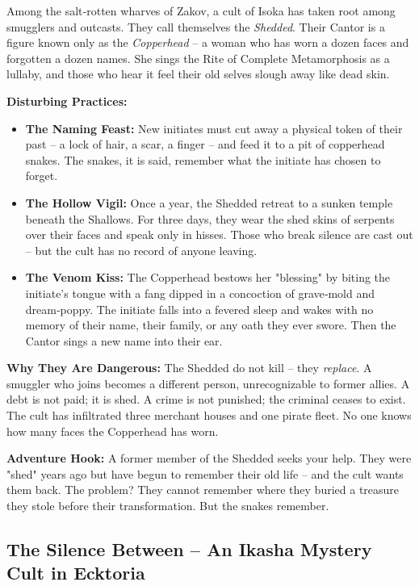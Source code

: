 \documentclass[10pt,a5paper]{book}
\begin{document}
Among the salt‑rotten wharves of Zakov, a cult of Isoka has taken root among smugglers and outcasts. They call themselves the \textit{Shedded}. Their Cantor is a figure known only as the \textit{Copperhead} -- a woman who has worn a dozen faces and forgotten a dozen names. She sings the Rite of Complete Metamorphosis as a lullaby, and those who hear it feel their old selves slough away like dead skin.

\textbf{Disturbing Practices:}
\begin{itemize}
    \item \textbf{The Naming Feast:} New initiates must cut away a physical token of their past -- a lock of hair, a scar, a finger -- and feed it to a pit of copperhead snakes. The snakes, it is said, remember what the initiate has chosen to forget.
    \item \textbf{The Hollow Vigil:} Once a year, the Shedded retreat to a sunken temple beneath the Shallows. For three days, they wear the shed skins of serpents over their faces and speak only in hisses. Those who break silence are cast out -- but the cult has no record of anyone leaving.
    \item \textbf{The Venom Kiss:} The Copperhead bestows her "blessing" by biting the initiate's tongue with a fang dipped in a concoction of grave‑mold and dream‑poppy. The initiate falls into a fevered sleep and wakes with no memory of their name, their family, or any oath they ever swore. Then the Cantor sings a new name into their ear.
\end{itemize}

\textbf{Why They Are Dangerous:} The Shedded do not kill -- they \textit{replace}. A smuggler who joins becomes a different person, unrecognizable to former allies. A debt is not paid; it is shed. A crime is not punished; the criminal ceases to exist. The cult has infiltrated three merchant houses and one pirate fleet. No one knows how many faces the Copperhead has worn.

\textbf{Adventure Hook:} A former member of the Shedded seeks your help. They were "shed" years ago but have begun to remember their old life -- and the cult wants them back. The problem? They cannot remember where they buried a treasure they stole before their transformation. But the snakes remember.

\subsection{The Silence Between -- An Ikasha Mystery Cult in Ecktoria}
\end{document}
